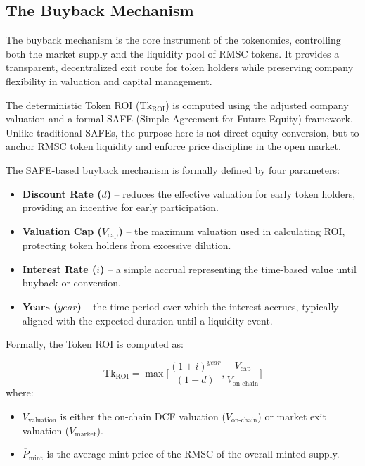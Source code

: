 \documentclass[conference]{IEEEtran}
\begin{document}
\subsection{The Buyback Mechanism}

The buyback mechanism is the core instrument of the tokenomics, controlling both the market supply and the liquidity pool of RMSC tokens. It provides a transparent, decentralized exit route for token holders while preserving company flexibility in valuation and capital management.

The deterministic Token ROI (\(\mathrm{Tk_{ROI}}\)) is computed using the adjusted company valuation and a formal SAFE (Simple Agreement for Future Equity) framework. Unlike traditional SAFEs, the purpose here is not direct equity conversion, but to anchor RMSC token liquidity and enforce price discipline in the open market.

The SAFE-based buyback mechanism is formally defined by four parameters:

\begin{itemize}
    \item \textbf{Discount Rate (\(d\))} – reduces the effective valuation for early token holders, providing an incentive for early participation.
    \item \textbf{Valuation Cap (\(V_\text{cap}\))} – the maximum valuation used in calculating ROI, protecting token holders from excessive dilution.
    \item \textbf{Interest Rate (\(i\))} – a simple accrual representing the time-based value until buyback or conversion.
    \item \textbf{Years (\(year\))} – the time period over which the interest accrues, typically aligned with the expected duration until a liquidity event.
\end{itemize}

Formally, the Token ROI is computed as:

\begin{equation}
\mathrm{Tk_{ROI}} = \max\Big[   \frac{ (1 + i)^{year}}{ (1 - d)}  , \frac{ V_\text{cap}}{V_\text{on-chain}} \Big]
\end{equation}
where:

\begin{itemize}
    \item \(V_\text{valuation}\) is either the on-chain DCF valuation (\(V_\text{on-chain}\)) or market exit valuation (\(V_\text{market}\)).
    \item \(\overline{P}_\text{mint}\) is the average mint price of the RMSC of the overall minted supply.
\end{itemize}
\end{document}
